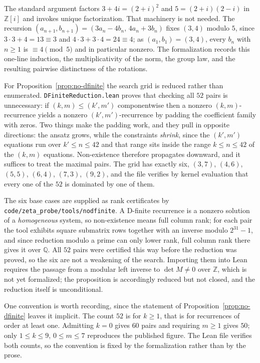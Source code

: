 \documentclass[11pt,a4paper]{article}
\theoremstyle{remark}
\theoremstyle{plain}
\begin{document}
The standard argument factors $3+4i = (2+i)^2$ and $5 = (2+i)(2-i)$ in $\mathbb{Z}[i]$ and
invokes unique factorization. That machinery is not needed. The recursion
$(a_{n+1}, b_{n+1}) = (3a_n - 4b_n,\, 4a_n + 3b_n)$ fixes $(3,4)$ modulo $5$, since
$3 \cdot 3 + 4 = 13 \equiv 3$ and $4 \cdot 3 + 3 \cdot 4 = 24 \equiv 4$; as $(a_1,b_1) = (3,4)$,
every $b_n$ with $n \ge 1$ is $\equiv 4 \pmod 5$ and in particular nonzero. The formalization
records this one-line induction, the multiplicativity of the norm, the group law, and the
resulting pairwise distinctness of the rotations.

For Proposition~\ref{prop:no-dfinite} the search grid is reduced rather than enumerated.
\texttt{DFiniteReduction.lean} proves that checking all $52$ pairs is unnecessary: if
$(k,m) \le (k',m')$ componentwise then a nonzero $(k,m)$-recurrence yields a nonzero
$(k',m')$-recurrence by padding the coefficient family with zeros. Two things make the padding
work, and they pull in opposite directions: the ansatz grows, while the constraints
\emph{shrink}, since the $(k',m')$ equations run over $k' \le n \le 42$ and that range sits
inside the range $k \le n \le 42$ of the $(k,m)$ equations. Non-existence therefore propagates
downward, and it suffices to treat the maximal pairs. The grid has exactly six,
$(3,7)$, $(4,6)$, $(5,5)$, $(6,4)$, $(7,3)$, $(9,2)$, and the file verifies by kernel
evaluation that every one of the $52$ is dominated by one of them.

The six base cases are supplied as rank certificates by
\texttt{code/zeta\_probe/tools/nodfinite}. A D-finite recurrence is a nonzero solution of a
\emph{homogeneous} system, so non-existence means full column rank; for each pair the tool
exhibits square submatrix rows together with an inverse modulo $2^{31}-1$, and since reduction
modulo a prime can only lower rank, full column rank there gives it over $\mathbb{Q}$. All
$52$ pairs were certified this way before the reduction was proved, so the six are not a
weakening of the search. Importing them into Lean requires the passage from a modular left
inverse to $\det M \neq 0$ over $\mathbb{Z}$, which is not yet formalized; the proposition is
accordingly reduced but not closed, and the reduction itself is unconditional.

One convention is worth recording, since the statement of Proposition~\ref{prop:no-dfinite}
leaves it implicit. The count $52$ is for $k \ge 1$, that is for recurrences of order at least
one. Admitting $k=0$ gives $60$ pairs and requiring $m \ge 1$ gives $50$; only
$1 \le k \le 9$, $0 \le m \le 7$ reproduces the published figure. The Lean file verifies both
counts, so the convention is fixed by the formalization rather than by the prose.
\end{document}
